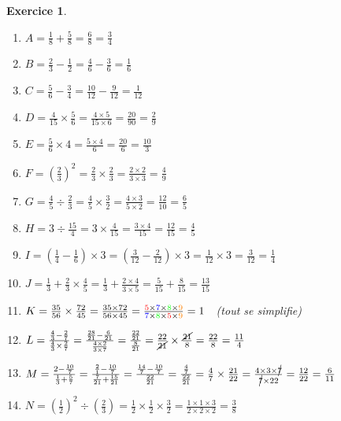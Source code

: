 \documentclass[10pt]{article}
\newtheorem{exo}{Exercice}
\begin{document}
\begin{exo}


\begin{multicols}{2}
\begin{enumerate}
\item $A=\frac{1}{8}+\frac{5}{8}=\frac{6}{8}=\frac{3}{4}$
\item $B=\frac{2}{3}-\frac{1}{2}=\frac{4}{6}-\frac{3}{6}=\frac{1}{6}$
\item $ C=\frac{5}{6}- \frac{3}{4}=\frac{10}{12}-\frac{9}{12}=\frac{1}{12}$
\item  $D=\frac{4}{15}\times \frac{5}{6}=\frac{4\times 5}{15\times 6}=\frac{20}{90}=\frac{2}{9}$
\item $E=\frac{5}{6}\times 4=\frac{5\times 4}{6}=\frac{20}{6}=\frac{10}{3}$
\item $ F=\left(\frac{2}{3}\right)^2=\frac{2}{3}\times \frac{2}{3}=\frac{2\times 2}{3\times 3}=\frac{4}{9}$
\item $ G=\frac{4}{5}\div\frac{2}{3}=\frac{4}{5}\times\frac{3}{2}=\frac{4\times 3}{5\times 2}=\frac{12}{10}=\frac{6}{5}$
\item $ H=3\div\frac{15}{4}=3\times\frac{4}{15}=\frac{3\times 4}{15}=\frac{12}{15}=\frac{4}{5}$
\item $I=\left(\frac{1}{4}-\frac{1}{6}\right)\times 3=\left(\frac{3}{12}-\frac{2}{12}\right)\times 3=\frac{1}{12}\times 3=\frac{3}{12}=\frac{1}{4}$
\item $ J=\frac{1}{3}+\frac{2}{3}\times\frac{4}{5}=\frac{1}{3}+\frac{2\times 4}{3\times 5}=\frac{5}{15}+\frac{8}{15}=\frac{13}{15}$
\item $ K=\frac{35}{56}\times\frac{72}{45}=\frac{35\times 72}{56\times 45}=\frac{\textcolor{red}{5}\times \textcolor{blue}{7}\times \textcolor{green}{8}\times \textcolor{orange}{9}}{ \textcolor{blue}{7}\times \textcolor{green}{8}\times \textcolor{red}{5}\times \textcolor{orange}{9}}=1~~$ (tout se simplifie)
\item $L=\frac{\frac{4}{3}-\frac{2}{7}}{\frac{4}{3}\times\frac{2}{7}}=\frac{\frac{28}{21}-\frac{6}{21}}{\frac{4\times 2}{3\times 7}}=\frac{\frac{22}{21}}{\frac{8}{21}}=\frac{22}{\cancel{21}}\times \frac{\cancel{21}}{8}=\frac{22}{8}=\frac{11}{4}
$
\item $ M=\frac{2-\frac{10}{7}}{\frac{1}{3}+\frac{5}{7}}=\frac{\frac{2}{1}-\frac{10}{7}}{\frac{7}{21}+\frac{15}{21}}=\frac{\frac{14}{7}-\frac{10}{7}}{\frac{22}{21}}
=\frac{\frac{4}{7}}{\frac{22}{21}}=\frac{4}{7}\times\frac{21}{22}=\frac{4\times 3\times \cancel{7}}{\cancel{7}\times 22}=\frac{12}{22}=\frac{6}{11}$
\item $ N=\left(\frac{1}{2}\right)^2\div\left(\frac{2}{3}\right)=\frac{1}{2}\times \frac{1}{2}\times \frac{3}{2}=\frac{1\times 1\times 3}{2\times 2\times 2}=\frac{3}{8}$

\end{enumerate}
\end{multicols}
\end{exo}
\end{document}
